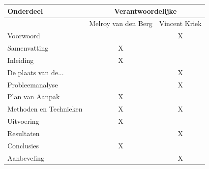 \documentclass[]{article}
\begin{document}
\begin{tabular}{|| l | c | c ||}\hline
    Onderdeel              &   \multicolumn{2}{|c||}{Verantwoordelijke} \\\hline
                           & Melroy van den Berg & Vincent Kriek        \\\hline\hline
    Voorwoord              &                     &  X                   \\\hline
    Samenvatting           &       X             &                      \\\hline
    Inleiding              &       X             &                      \\\hline
    De plaats van de...    &                     &  X                   \\\hline
    Probleemanalyse        &                     &  X                   \\\hline
    Plan van Aanpak        &       X             &                      \\\hline
    Methoden en Technieken &       X             &  X                   \\\hline
    Uitvoering             &       X             &                      \\\hline
    Resultaten             &                     &  X                   \\\hline
    Conclusies             &       X             &                      \\\hline
    Aanbeveling            &                     &  X                   \\\hline
\end{tabular}              
\end{document}
